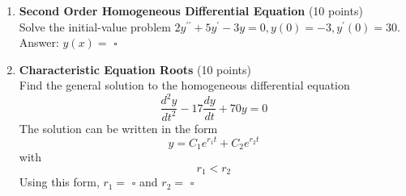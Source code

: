 \begin{enumerate}
\begin{enumerate}[label=\alph*]
\begin{subanswer}
    \end{subanswer}
    \item As $t \rightarrow \infty$, how much solute is in each tank?\\
    In the long run, Tank 1 will have $\square$ kg of solute.\\
    In the long run, Tank 2 will have $\square$ kg of solute.\\
    (Reread the question and think about why this answer makes sense.)\\
    \begin{subanswer}
    \end{subanswer}
  \end{enumerate}


  \item \textbf{Second Order Homogeneous Differential Equation} (10 points)\\
  Solve the initial-value problem $2 y^{\prime \prime}+5 y^{\prime}-3 y=0, y(0)=-3, y^{\prime}(0)=30$.\\
  Answer: $y(x)=$ $\square$\\
  \begin{subanswer}
  \end{subanswer}

  \item \textbf{Characteristic Equation Roots} (10 points)\\
  Find the general solution to the homogeneous differential equation
  $$
  \frac{d^2 y}{d t^2}-17 \frac{d y}{d t}+70 y=0
  $$
  The solution can be written in the form
  $$
  y=C_1 e^{r_1 t}+C_2 e^{r_2 t}
  $$
  with
  $$
  r_1<r_2
  $$
  Using this form, $r_1=$ $\square$ and $r_2=$ $\square$\\
  \begin{subanswer}
  \end{subanswer}

  \newpage


\end{enumerate}
